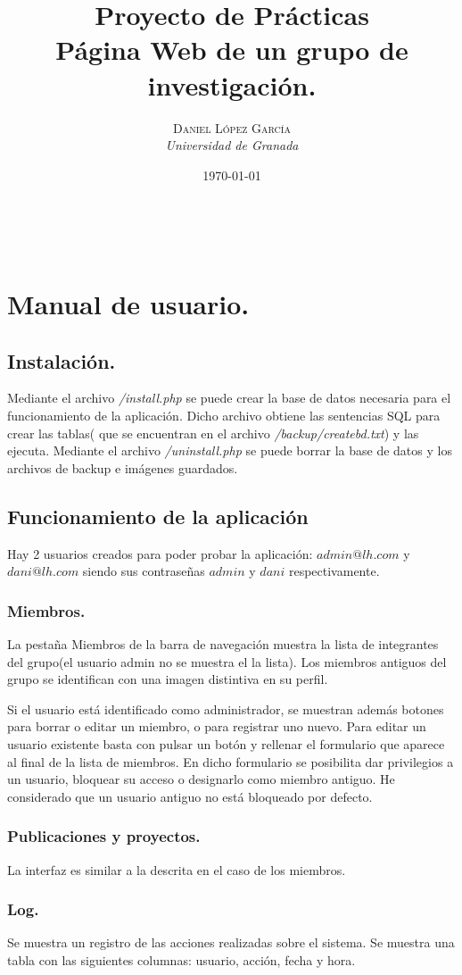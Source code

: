 \documentclass[a4paper, 11pt]{article} %
\title{\textbf{Proyecto de Prácticas}\\ %
\vspace{20 pt}Página Web de un grupo de investigación.
} %
\author{\textsc{Daniel López García} %
\\{\textit{Universidad de Granada}}} %
\date{\today} %
\makeatletter
\renewcommand{\maketitle}{ %
	\begin{center} %
		{\Huge\@title} %
	\end{center}
	
	\vspace{20pt} %
	
	\begin{flushright} %
		{\large\@author} %
		\\\@date %
		
		\vspace{40pt} %
	\end{flushright}
	\renewcommand{\baselinestretch}{0.5}
	
}
\makeatother
\begin{document}
	\maketitle
\section{Manual de usuario.}
\subsection{Instalación.}
Mediante el archivo \emph{/install.php} se puede crear la base de datos necesaria para el funcionamiento de la aplicación. Dicho archivo obtiene las sentencias SQL para crear las tablas( que se encuentran en el archivo \emph{/backup/createbd.txt}) y las ejecuta.
Mediante el archivo \emph{/uninstall.php} se puede borrar la base de datos y los archivos de backup e imágenes guardados.
\subsection{Funcionamiento de la aplicación}Hay 2 usuarios creados para poder probar la aplicación: $admin@lh.com$ y $dani@lh.com$ siendo sus contraseñas $admin$ y $dani$ respectivamente. 
\subsubsection{Miembros.} La pestaña Miembros de la barra de navegación muestra la lista de integrantes del grupo(el usuario admin no se muestra el la lista). Los miembros antiguos del grupo se identifican con una imagen distintiva en su perfil. 

\medskip

Si el usuario está identificado como administrador, se muestran además botones para borrar o editar un miembro, o para registrar uno nuevo. Para editar un usuario existente basta con pulsar un botón y rellenar el formulario que aparece al final de la lista de miembros. En dicho formulario se posibilita dar privilegios a un usuario, bloquear su acceso o designarlo como miembro antiguo. He considerado que un usuario antiguo no está bloqueado por defecto.

\subsubsection{Publicaciones y proyectos.} La interfaz es similar a la descrita en el caso de los miembros.
\subsubsection{Log.} Se muestra un registro de las acciones realizadas sobre el sistema. Se muestra una tabla con las siguientes columnas: usuario, acción, fecha y hora.
\end{document}
